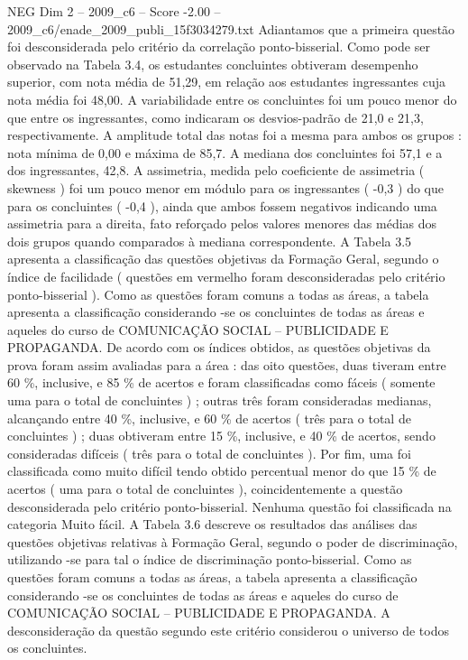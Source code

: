 \begin{textsample}{NEG Dim 2 – 2009\_c6 – Score -2.00 – 2009\_c6/enade\_2009\_publi\_15f3034279.txt}
Adiantamos que a primeira questão foi desconsiderada pelo critério da correlação ponto-bisserial.
Como pode ser observado na Tabela 3.4, os estudantes concluintes obtiveram desempenho superior, com nota média de 51,29, em relação aos estudantes ingressantes cuja nota média foi 48,00.
A variabilidade entre os concluintes foi um pouco menor do que entre os ingressantes, como indicaram os desvios-padrão de 21,0 e 21,3, respectivamente.
A amplitude total das notas foi a mesma para ambos os grupos : nota mínima de 0,00 e máxima de 85,7.
A mediana dos concluintes foi 57,1 e a dos ingressantes, 42,8.
A assimetria, medida pelo coeficiente de assimetria ( skewness ) foi um pouco menor em módulo para os ingressantes ( -0,3 ) do que para os concluintes ( -0,4 ), ainda que ambos fossem negativos indicando uma assimetria para a direita, fato reforçado pelos valores menores das médias dos dois grupos quando comparados à mediana correspondente.
A Tabela 3.5 apresenta a classificação das questões objetivas da Formação Geral, segundo o índice de facilidade ( questões em vermelho foram desconsideradas pelo critério ponto-bisserial ).
Como as questões foram comuns a todas as áreas, a tabela apresenta a classificação considerando -se os concluintes de todas as áreas e aqueles do curso de COMUNICAÇÃO SOCIAL – PUBLICIDADE E PROPAGANDA.
De acordo com os índices obtidos, as questões objetivas da prova foram assim avaliadas para a área : das oito questões, duas tiveram entre 60 \%, inclusive, e 85 \% de acertos e foram classificadas como fáceis ( somente uma para o total de concluintes ) ; outras três foram consideradas medianas, alcançando entre 40 \%, inclusive, e 60 \% de acertos ( três para o total de concluintes ) ; duas obtiveram entre 15 \%, inclusive, e 40 \% de acertos, sendo consideradas difíceis ( três para o total de concluintes ).
Por fim, uma foi classificada como muito difícil tendo obtido percentual menor do que 15 \% de acertos ( uma para o total de concluintes ), coincidentemente a questão desconsiderada pelo critério ponto-bisserial.
Nenhuma questão foi classificada na categoria Muito fácil.
A Tabela 3.6 descreve os resultados das análises das questões objetivas relativas à Formação Geral, segundo o poder de discriminação, utilizando -se para tal o índice de discriminação ponto-bisserial.
Como as questões foram comuns a todas as áreas, a tabela apresenta a classificação considerando -se os concluintes de todas as áreas e aqueles do curso de COMUNICAÇÃO SOCIAL – PUBLICIDADE E PROPAGANDA.
A desconsideração da questão segundo este critério considerou o universo de todos os concluintes.

\end{textsample}
